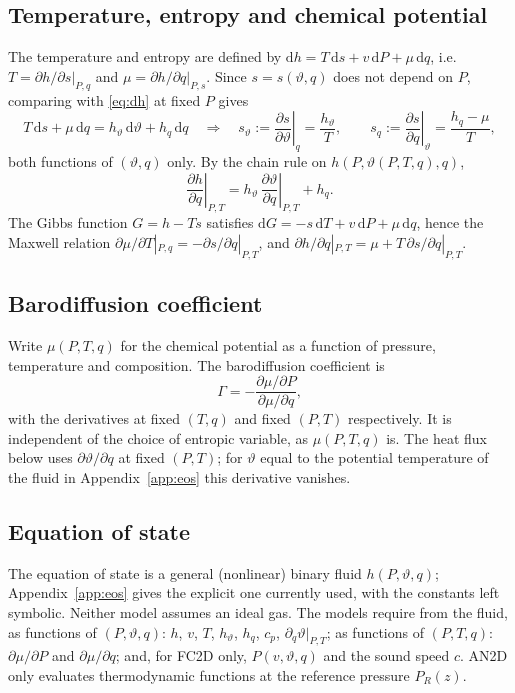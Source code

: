 \documentclass[11pt,a4paper]{article}
\newcommand{\vt}{\vartheta}                    %
\newcommand{\hth}{{h_{\vartheta}}}               %
\newcommand{\hq}{{h_q}}                          %
\newcommand{\pdc}[3]{\left.\frac{\partial #1}{\partial #2}\right|_{#3}}
\begin{document}
\subsection{Temperature, entropy and chemical potential}
The temperature and entropy are defined by $\mathrm{d}h=T\,\mathrm{d}s+v\,\mathrm{d}P+\mu\,\mathrm{d}q$, i.e.\ $T=\partial h/\partial s|_{P,q}$ and $\mu=\partial h/\partial q|_{P,s}$.
Since $s=s(\vt,q)$ does not depend on $P$, comparing with \eqref{eq:dh} at fixed $P$ gives
\begin{equation}
  T\,\mathrm{d}s+\mu\,\mathrm{d}q=\hth\,\mathrm{d}\vt+\hq\,\mathrm{d}q
  \quad\Longrightarrow\quad
  s_\vt:=\pdc{s}{\vt}{q}=\frac{\hth}{T},\qquad s_q:=\pdc{s}{q}{\vt}=\frac{\hq-\mu}{T},
  \label{eq:sderiv}
\end{equation}
both functions of $(\vt,q)$ only. By the chain rule on $h(P,\vt(P,T,q),q)$,
\begin{equation}
  \pdc{h}{q}{P,T}=\hth\,\pdc{\vt}{q}{P,T}+\hq .
  \label{eq:hq}
\end{equation}
The Gibbs function $G=h-Ts$ satisfies $\mathrm{d}G=-s\,\mathrm{d}T+v\,\mathrm{d}P+\mu\,\mathrm{d}q$, hence the Maxwell relation
$\partial\mu/\partial T|_{P,q}=-\partial s/\partial q|_{P,T}$, and $\partial h/\partial q|_{P,T}=\mu+T\,\partial s/\partial q|_{P,T}$.

\subsection{Barodiffusion coefficient}
Write $\mu(P,T,q)$ for the chemical potential as a function of pressure, temperature and composition. The barodiffusion coefficient is
\begin{equation}
  \Gamma = -\frac{\partial\mu/\partial P}{\partial\mu/\partial q},
  \label{eq:Gamma}
\end{equation}
with the derivatives at fixed $(T,q)$ and fixed $(P,T)$ respectively. It is independent of the choice of entropic variable, as $\mu(P,T,q)$ is.
The heat flux below uses $\partial\vt/\partial q$ at fixed $(P,T)$; for $\vt$ equal to the potential temperature of the fluid in Appendix~\ref{app:eos} this derivative vanishes.

\subsection{Equation of state}
The equation of state is a general (nonlinear) binary fluid $h(P,\vt,q)$; Appendix~\ref{app:eos}
gives the explicit one currently used, with the constants left symbolic. Neither model assumes an ideal gas.
The models require from the fluid, as functions of $(P,\vt,q)$: $h$, $v$, $T$, $\hth$, $\hq$, $c_p$, $\partial_q\vt|_{P,T}$;
as functions of $(P,T,q)$: $\partial\mu/\partial P$ and $\partial\mu/\partial q$; and, for FC2D only, $P(v,\vt,q)$ and the sound speed $c$.
AN2D only evaluates thermodynamic functions at the reference pressure $P_R(z)$.
\end{document}
